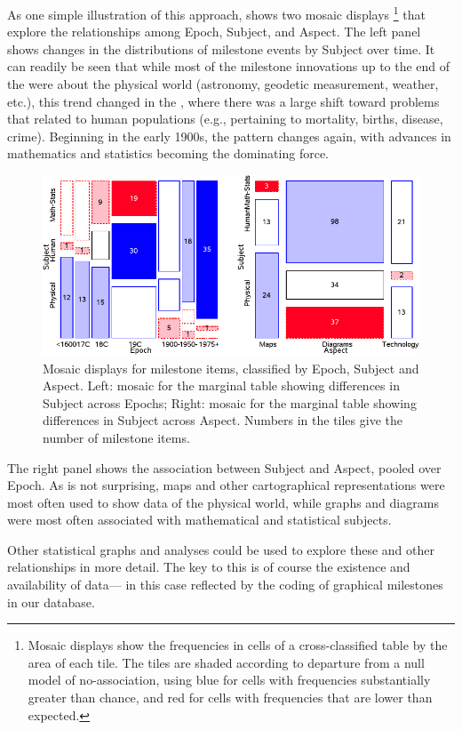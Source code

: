 As one simple illustration of this approach,  shows two mosaic displays%
\footnote{Mosaic displays show the frequencies in cells of a cross-classified table by the area of each tile.  The tiles are shaded according to departure from a null
model of no-association, using blue for cells with frequencies substantially greater than chance, and red for cells with frequencies that are lower than expected.}
that explore the relationships among Epoch, Subject, and Aspect. The left panel shows changes in the distributions of milestone events by Subject over time.  It can readily be seen that while most of the milestone innovations up to the end of the  were about the physical world (astronomy, geodetic measurement, weather, etc.), this trend changed in the , where there was a large shift toward problems that related to human populations (e.g., pertaining to mortality, births, disease, crime). Beginning in the early 1900s, the pattern changes again, with advances in mathematics and statistics becoming the dominating force.

\begin{figure}[!htb]
  \centering
  \includegraphics[width=\textwidth,clip]{fig/milecats4}
  \caption{Mosaic displays for milestone items, classified by Epoch, Subject and Aspect. Left: mosaic for the marginal table showing differences in Subject across Epochs; Right: mosaic for the marginal table showing differences in Subject across Aspect. Numbers in the tiles give the number of milestone items.}
  \label{fig:milecats4}
\end{figure}

The right panel shows the association between Subject and Aspect, pooled over Epoch. As is not surprising, maps and other cartographical representations were most often used to show data of the physical world, while graphs and diagrams were most often associated with mathematical and statistical subjects.

Other statistical graphs and analyses could be used to explore these and other relationships in more detail. The key to this is of course the existence and availability of data--- in this case reflected by the coding of graphical milestones in our database.
